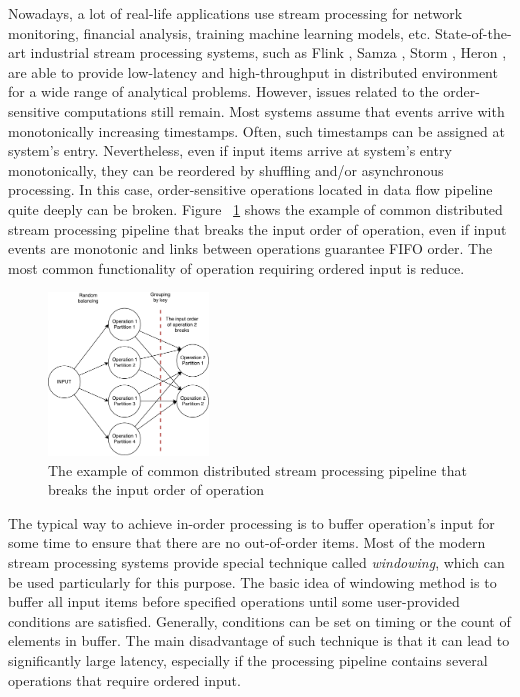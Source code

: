 
\label {fs-intro}

Nowadays, a lot of real-life applications use stream processing for network monitoring, financial analysis, training machine learning models, etc. State-of-the-art industrial stream processing systems, such as Flink \cite{carbone2015apache}, Samza \cite{Noghabi:2017:SSS:3137765.3137770}, Storm \cite{apache:storm}, Heron \cite{Kulkarni:2015:THS:2723372.2742788}, are able to provide low-latency and high-throughput in distributed environment for a wide range of analytical problems. However, issues related to the order-sensitive computations still remain. Most systems assume that events arrive with monotonically increasing timestamps. Often, such timestamps can be assigned at system's entry. Nevertheless, even if input items arrive at system's entry monotonically, they can be reordered by shuffling and/or asynchronous processing. In this case, order-sensitive operations located in data flow pipeline quite deeply can be broken. Figure ~\ref{break-order-dataflow} shows the example of common distributed stream processing pipeline that breaks the input order of operation, even if input events are monotonic and links between operations guarantee FIFO order. The most common functionality of operation requiring ordered input is reduce. 

\begin{figure}[htbp]
  \centering
  \includegraphics[width=0.38\textwidth]{pics/break_order_pipeline}
  \caption{The example of common distributed stream processing pipeline that breaks the input order of operation}
  \label {break-order-dataflow}
\end{figure}

The typical way to achieve in-order processing is to buffer operation's input for some time to ensure that there are no out-of-order items. Most of the modern stream processing systems provide special technique called {\it windowing}, which can be used particularly for this purpose. The basic idea of windowing method is to buffer all input items before specified operations until some user-provided conditions are satisfied. Generally, conditions can be set on timing or the count of elements in buffer. The main disadvantage of such technique is that it can lead to significantly large latency, especially if the processing pipeline contains several operations that require ordered input. 

